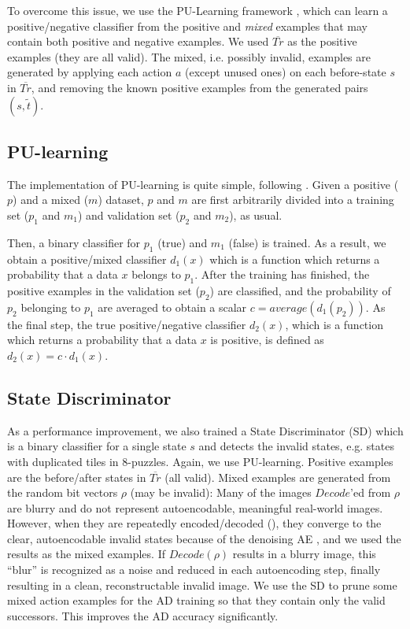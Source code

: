 \documentclass[11pt]{article}
\begin{document}
To overcome this issue, we use the PU-Learning framework \cite{elkan2008learning}, which can learn a positive/negative classifier from the positive and \emph{mixed} examples that may contain both positive and negative examples.
% 
We used $\overline{Tr}$ as the positive examples (they are all valid).
The mixed, i.e. possibly invalid, examples are generated by
applying each action $a$ (except unused ones) on each before-state $s$ in $\overline{Tr}$, and
removing the known positive examples from the generated pairs $(s,\tilde{t})$.

\subsection{PU-learning}
\label{sec:pu-learning}

The implementation of PU-learning is quite simple, following \cite{elkan2008learning}.
Given a positive ($p$) and a mixed ($m$) dataset,
 $p$ and $m$ are first arbitrarily divided into a training set ($p_1$ and $m_1$)
and validation set ($p_2$ and $m_2$), as usual.

Then, a binary classifier for $p_1$ (true) and $m_1$ (false) is trained.
As a result, we obtain a positive/mixed classifier $d_1(x)$ which is a function which returns a probability
that a data $x$ belongs to $p_1$.
% 
After the training has finished,
the positive examples in the validation set ($p_2$) are classified, and
the  probability of $p_2$ belonging to $p_1$ are averaged to obtain a scalar $c = average(d_1(p_2))$.
% 
As the final step, the true positive/negative classifier $d_2(x)$,
which is a function which returns a probability that a data $x$ is positive,
is defined as $d_2(x) = c \cdot d_1(x)$. 


\subsection{State Discriminator}

As a performance improvement, we also trained a State Discriminator (SD) which is a binary classifier for a single state $s$ and detects the invalid states, e.g. states with duplicated tiles in 8-puzzles. Again, we use PU-learning. Positive examples are the before/after states in $\overline{Tr}$ (all valid). Mixed examples are generated from the random bit vectors $\rho$ (may be invalid):
Many of the images $Decode$'ed from $\rho$ are blurry and do not represent autoencodable, meaningful real-world images.
However, when they are repeatedly encoded/decoded (), they converge to the clear, autoencodable invalid states because of the denoising AE \cite{vincent2008extracting}, and we used the results as the mixed examples.
If $Decode(\rho)$ results in a blurry image,
this ``blur'' is recognized as a noise and reduced in each autoencoding step,
finally resulting in a clean, reconstructable invalid image.
We use the SD to prune some mixed action examples for the AD training so that they contain only the valid successors.
This improves the AD accuracy significantly.
\end{document}
